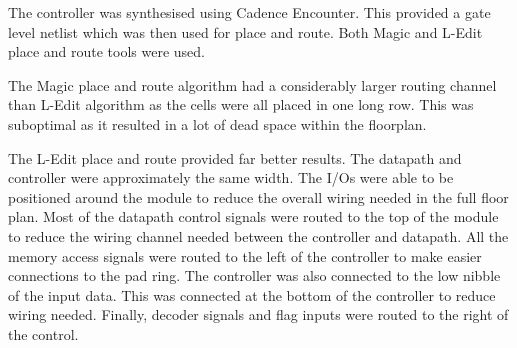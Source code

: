 The controller was synthesised using Cadence Encounter. 
This provided a gate level netlist which was then used for place and route.
Both Magic and L-Edit place and route tools were used. 

The Magic place and route algorithm had a considerably larger routing channel than L-Edit algorithm as the cells were all placed in one long row. 
This was suboptimal as it resulted in a lot of dead space within the floorplan.

The L-Edit place and route provided far better results. 
The datapath and controller were approximately the same width. 
The I/Os were able to be positioned around the module to reduce the overall wiring needed in the full floor plan. 
Most of the datapath control signals were routed to the top of the module to reduce the wiring channel needed between the controller and datapath.
All the memory access signals were routed to the left of the controller to make easier connections to the pad ring. 
The controller was also connected to the low nibble of the input data. 
This was connected at the bottom of the controller to reduce wiring needed. 
Finally, decoder signals and flag inputs were routed to the right of the control. 


